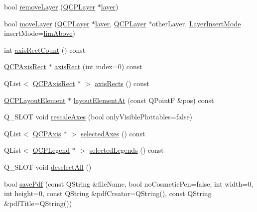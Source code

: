 \begin{DoxyCompactItemize}
\item 
bool \hyperlink{classQCustomPlot_a40f75e342c5eaab6a86066a42a0e2a94}{remove\+Layer} (\hyperlink{classQCPLayer}{Q\+C\+P\+Layer} $\ast$\hyperlink{classQCustomPlot_aac492da01782820454e9136a8db28182}{layer})
\item 
bool \hyperlink{classQCustomPlot_ae896140beff19424e9e9e02d6e331104}{move\+Layer} (\hyperlink{classQCPLayer}{Q\+C\+P\+Layer} $\ast$\hyperlink{classQCustomPlot_aac492da01782820454e9136a8db28182}{layer}, \hyperlink{classQCPLayer}{Q\+C\+P\+Layer} $\ast$other\+Layer, \hyperlink{classQCustomPlot_a75a8afbe6ef333b1f3d47abb25b9add7}{Layer\+Insert\+Mode} insert\+Mode=\hyperlink{classQCustomPlot_a75a8afbe6ef333b1f3d47abb25b9add7a062b0b7825650b432a713c0df6742d41}{lim\+Above})
\item 
int \hyperlink{classQCustomPlot_a340fa24b1607e445cedda9685670ead3}{axis\+Rect\+Count} () const 
\item 
\hyperlink{classQCPAxisRect}{Q\+C\+P\+Axis\+Rect} $\ast$ \hyperlink{classQCustomPlot_a4a37a1add5fe63060ac518cf0a4c4050}{axis\+Rect} (int index=0) const 
\item 
Q\+List$<$ \hyperlink{classQCPAxisRect}{Q\+C\+P\+Axis\+Rect} $\ast$ $>$ \hyperlink{classQCustomPlot_afd67094aaeccbc5719761348b2d8c891}{axis\+Rects} () const 
\item 
\hyperlink{classQCPLayoutElement}{Q\+C\+P\+Layout\+Element} $\ast$ \hyperlink{classQCustomPlot_a840458186d4483c8a42d6a399448d38f}{layout\+Element\+At} (const Q\+PointF \&pos) const 
\item 
Q\+\_\+\+S\+L\+OT void \hyperlink{classQCustomPlot_ad86528f2cee6c7e446dea4a6e8839935}{rescale\+Axes} (bool only\+Visible\+Plottables=false)
\item 
Q\+List$<$ \hyperlink{classQCPAxis}{Q\+C\+P\+Axis} $\ast$ $>$ \hyperlink{classQCustomPlot_aa6baf867e8beb96ed5bd471f83ece903}{selected\+Axes} () const 
\item 
Q\+List$<$ \hyperlink{classQCPLegend}{Q\+C\+P\+Legend} $\ast$ $>$ \hyperlink{classQCustomPlot_a1ea6297300c3e2770e65f95836411755}{selected\+Legends} () const 
\item 
Q\+\_\+\+S\+L\+OT void \hyperlink{classQCustomPlot_a9d4808ab925b003054085246c92a257c}{deselect\+All} ()
\item 
bool \hyperlink{classQCustomPlot_a632da44c6d94ea8b271eb483b08b5114}{save\+Pdf} (const Q\+String \&file\+Name, bool no\+Cosmetic\+Pen=false, int width=0, int height=0, const Q\+String \&pdf\+Creator=Q\+String(), const Q\+String \&pdf\+Title=Q\+String())
\item 

\end{DoxyCompactItemize}
